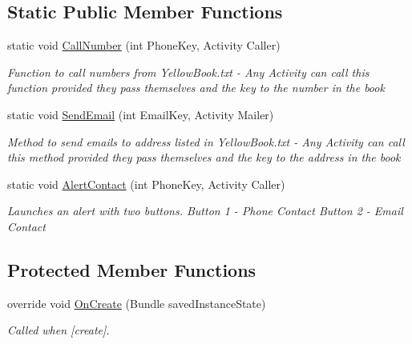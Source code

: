 \subsection*{Static Public Member Functions}
\begin{DoxyCompactItemize}
\item 
static void \hyperlink{class_w_c_c_mobile_1_1_contacts_actvity_a23ad5907d321ef68cc2d4ffe1bb8d1ee}{Call\+Number} (int Phone\+Key, Activity Caller)
\begin{DoxyCompactList}\small\item\em Function to call numbers from Yellow\+Book.\+txt -\/ Any Activity can call this function provided they pass themselves and the key to the number in the book \end{DoxyCompactList}\item 
static void \hyperlink{class_w_c_c_mobile_1_1_contacts_actvity_af752661848689d2b5c4375d132fc9121}{Send\+Email} (int Email\+Key, Activity Mailer)
\begin{DoxyCompactList}\small\item\em Method to send emails to address listed in Yellow\+Book.\+txt -\/ Any Activity can call this method provided they pass themselves and the key to the address in the book \end{DoxyCompactList}\item 
static void \hyperlink{class_w_c_c_mobile_1_1_contacts_actvity_a6c30b1b39fbee4678d39606ccb8abe0e}{Alert\+Contact} (int Phone\+Key, Activity Caller)
\begin{DoxyCompactList}\small\item\em Launches an alert with two buttons. Button 1 -\/ Phone Contact Button 2 -\/ Email Contact \end{DoxyCompactList}\end{DoxyCompactItemize}
\subsection*{Protected Member Functions}
\begin{DoxyCompactItemize}
\item 
override void \hyperlink{class_w_c_c_mobile_1_1_contacts_actvity_a2e7c8c223ecc577fc737a54cf69576d0}{On\+Create} (Bundle saved\+Instance\+State)
\begin{DoxyCompactList}\small\item\em Called when \mbox{[}create\mbox{]}. \end{DoxyCompactList}\end{DoxyCompactItemize}


